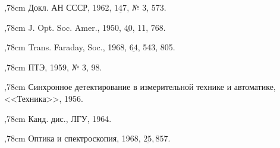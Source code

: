 \noindent{},78cm
 Докл. АН СССР,
1962, $\underline{147}$, № 3, 573.


\noindent{},78cm
 J. Opt. Soc. Amer., 1950,
$\underline{40}$, 11, 768.


\noindent{},78cm
 Trans. Faraday, Soc., 1968,
$\underline{64}$, 543, 805.


\noindent{},78cm
 ПТЭ, 1959, № 3, 98.


\noindent{},78cm
 Синхронное детектирование в
измерительной технике и автоматике, <<Техника>>, 1956.


\noindent{},78cm
 Канд. дис., ЛГУ, 1964.


\noindent{},78cm
 Оптика и спектроскопия, 1968,
$\underline{25}, 857.$

